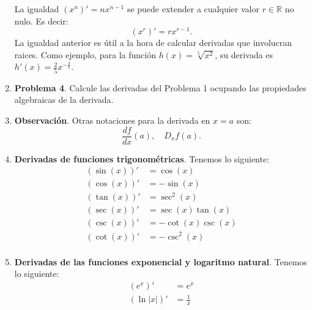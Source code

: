 \documentclass[10pt]{article}
\newcommand{\2}[1]{\hspace{-0.93cm}\colorbox{color1}{\hspace{0.07cm} \parbox{17cm}{\vspace{0.2cm} #1}\hspace*{0.07cm} }}
\newcommand{\3}[1]{\hspace{-0.93cm}\colorbox{color7}{\hspace{0.07cm} \parbox{17cm}{\vspace{0.2cm} #1}\hspace*{0.07cm} }}
\theoremstyle{theorem}
\numberwithin{equation}{section}
\begin{document}
\begin{enumerate}[1.]
La igualdad $(x^n)'=nx^{n-1}$ se puede extender a cualquier valor $r\in\mathbb{R}$ no nulo. Es decir:
    \begin{equation*}
        (x^r)'=rx^{r-1}. 
    \end{equation*}
La igualdad anterior es \'util a la hora de calcular derivadas que involucran raices. Como ejemplo, para la funci\'on $h(x)=\sqrt[5]{x^2}$, su derivada es $h'(x)=\displaystyle \frac{2}{5}x^{-\frac{3}{5}}$.
   \item[] \textbf{Problema 4}. Calcule las derivadas del Problema 1 ocupando las propiedades algebraicas de la derivada.
   \item \textbf{Observaci\'on}. Otras notaciones para la derivada en $x=a$ son: $$\frac{df}{dx}(a),\quad D_xf(a).$$
   \item \textbf{Derivadas de funciones trigonom\'etricas}. Tenemos lo siguiente:
   \begin{align*}
   (\sin(x))'&=\cos(x)\\
   (\cos(x))'&=-\sin(x)\\
   (\tan(x))'&=\sec^2(x)\\
   (\sec(x))'&=\sec(x)\tan(x)\\
   (\csc(x))'&=-\cot(x)\csc(x)\\
   (\cot(x))'&=-\csc^2(x)\\
   \end{align*}
   \item \textbf{Derivadas de las funciones exponencial y logaritmo natural}. Tenemos lo siguiente:
   \begin{align*}
   (e^x)'&=e^x\\
   (\ln|x|)'&=\frac{1}{x}
\end{align*}    
\end{enumerate}
\end{document}
